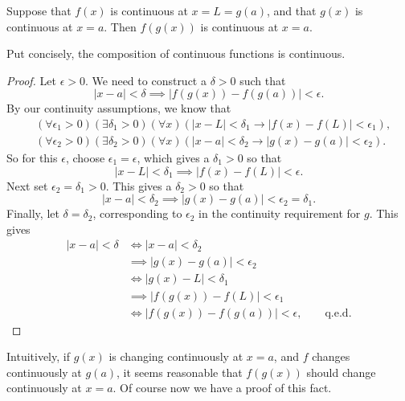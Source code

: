\begin{theorem}
Suppose that $f(x)$ is continuous at $x=L=g(a)$,
and that $g(x)$ is continuous at $x=a$.  Then
$f(g(x))$ is continuous at $x=a$.
\label{CompositionOfContinuousFunctionsIsContinuous}\end{theorem}
Put concisely, the composition of continuous functions is continuous.

\begin{proof}
Let $\epsilon>0$.  We need to construct a $\delta>0$
such that
$$|x-a|<\delta\implies|f(g(x))-f(g(a))|<\epsilon.$$
By our continuity assumptions, we know that
\begin{align*}
&(\forall\epsilon_1>0)(\exists\delta_1>0)(\forall x)(|x-L|<\delta_1
  \longrightarrow|f(x)-f(L)|<\epsilon_1),\\
&(\forall\epsilon_2>0)(\exists\delta_2>0)(\forall x)(|x-a|<\delta_2
  \longrightarrow|g(x)-g(a)|<\epsilon_2).\end{align*}
So for this $\epsilon$, choose $\epsilon_1=\epsilon$,
which gives a $\delta_1>0$ so that
$$|x-L|<\delta_1\implies|f(x)-f(L)|<\epsilon.$$
Next set $\epsilon_2=\delta_1>0$. This gives a $\delta_2>0$
so that 
$$|x-a|<\delta_2\implies|g(x)-g(a)|<\epsilon_2=\delta_1.$$
Finally, let $\delta=\delta_2$, corresponding to $\epsilon_2$
in the continuity requirement for $g$. This gives
\begin{align*}
|x-a|<\delta&\iff|x-a|<\delta_2\\
&\implies|g(x)-g(a)|<\epsilon_2\\
&\iff |g(x)-L|<\delta_1\\
&\implies |f(g(x))-f(L)|<\epsilon_1\\
&\iff |f(g(x))-f(g(a))|<\epsilon,\qquad\text{q.e.d.}
\end{align*}
\end{proof} 
Intuitively, if $g(x)$ is changing continuously at $x=a$,
and $f$ changes continuously at $g(a)$, it seems
reasonable that $f(g(x))$ should change continuously
at $x=a$.  Of course now we have a proof of this fact.

